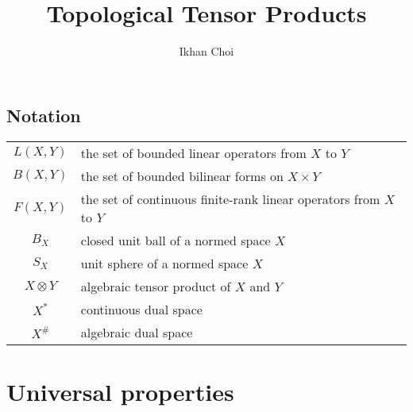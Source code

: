 \documentclass{../../small}
\begin{document}
\title{Topological Tensor Products}
\author{Ikhan Choi}
\maketitle
\tableofcontents

\subsection*{Notation}
\begin{tabular}{cl}
$L(X,Y)$ & the set of bounded linear operators from $X$ to $Y$\\
$B(X,Y)$ & the set of bounded bilinear forms on $X\times Y$\\
$F(X,Y)$ & the set of continuous finite-rank linear operators from $X$ to $Y$\\
$B_X$ & closed unit ball of a normed space $X$\\
$S_X$ & unit sphere of a normed space $X$\\
$X\otimes Y$ & algebraic tensor product of $X$ and $Y$\\
$X^*$ & continuous dual space\\
$X^\#$ & algebraic dual space
\end{tabular}

\newpage
\section{Universal properties}
\end{document}
